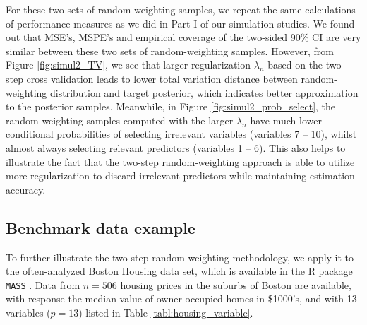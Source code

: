 \documentclass[ejs,authoryear,linksfromyear]{imsart}
\numberwithin{equation}{section}
\theoremstyle{plain}
\begin{document}
For these two sets of random-weighting samples, we repeat the same calculations of performance measures as we did in Part I of our simulation studies. We found out that MSE's, MSPE's and empirical coverage of the two-sided 90\% CI are very similar between these two sets of random-weighting samples. However, from Figure \ref{fig:simul2_TV}, we see that larger regularization $\lambda_n$ based on the two-step cross validation leads to lower total variation distance between random-weighting distribution and target posterior, which indicates better approximation to the posterior samples. Meanwhile, in Figure \ref{fig:simul2_prob_select}, the random-weighting samples computed with the larger $\lambda_n$ have much lower conditional  probabilities of selecting irrelevant variables (variables 7 -- 10), whilst almost always selecting relevant predictors (variables 1 -- 6). This also helps to illustrate the fact that the two-step random-weighting approach is able to utilize more regularization to discard irrelevant predictors while maintaining estimation accuracy.   

\subsection{Benchmark data example}

To further illustrate the two-step random-weighting methodology, we apply it to the often-analyzed Boston Housing data set, which is available in the R package \texttt{MASS} \citep{MASS}. Data from $n = 506$ housing prices in the suburbs of Boston are available, with response the median value of owner-occupied homes in \$1000's, and with 13 variables ($p= 13$) listed in Table \ref{tabl:housing_variable}.
\end{document}
